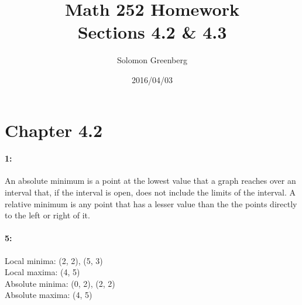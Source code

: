 \documentclass{article}
\title{Math 252 Homework\\
\large Sections 4.2 \& 4.3}
\date{2016/04/03}
\author{Solomon Greenberg}
\begin{document}
    \maketitle
    \newpage

    \section*{Chapter 4.2}
    \paragraph*{1:\\}
        An absolute minimum is a point at the lowest value that a graph reaches over an interval that, if the interval is open, does not include the limits of the interval. A relative minimum is any point that has a lesser value than the the points directly to the left or right of it.

    \paragraph*{5:\\}
        Local minima: (2, 2), (5, 3) \\
        Local maxima: (4, 5) \\
        Absolute minima: (0, 2), (2, 2) \\
        Absolute maxima: (4, 5) \\
\end{document}

